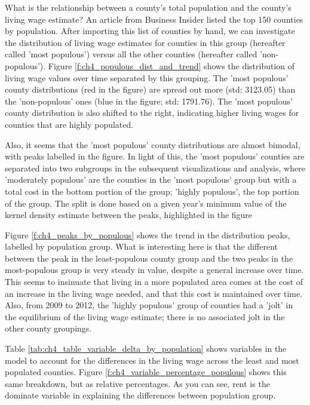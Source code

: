 What is the relationship between a county's total population and the county's living wage estimate? An article from Business Insider \cite{populated_counties} listed the top 150 counties by population. After importing this list of counties by hand, we can investigate the distribution of living wage estimates for counties in this group (hereafter called 'most populous') versus all the other counties (hereafter called 'non-populous'). Figure \ref{f:ch4_populous_dist_and_trend} shows the distribution of living wage values over time separated by this grouping. The 'most populous' county distributions (red in the figure) are spread out more (std: 3123.05) than the 'non-populous' ones (blue in the figure; std: 1791.76). The 'most populous' county distribution is also shifted to the right, indicating higher living wages for counties that are highly populated. 

Also, it seems that the 'most populous' county distributions are almost bimodal, with peaks labelled in the figure. In light of this, the 'most populous' counties are separated into two subgroups in the subsequent visualizations and analysis, where 'moderately populous' are the counties in the 'most populous' group but with a total cost in the bottom portion of the group; 'highly populous', the top portion of the group. The split is done based on a given year's minimum value of the kernel density estimate between the peaks, highlighted in the figure

Figure \ref{f:ch4_peaks_by_populous} shows the trend in the distribution peaks, labelled by population group. What is interesting here is that the different between the peak in the least-populous county group and the two peaks in the most-populous group is very steady in value, despite a general increase over time. This seems to insinuate that living in a more populated area comes at the cost of an increase in the living wage needed, and that this cost is maintained over time. Also, from 2009 to 2012, the 'highly populous' group of counties had a 'jolt' in the equilibrium of the living wage estimate; there is no associated jolt in the other county groupings.

Table \ref{tab:ch4_table_variable_delta_by_population} shows variables in the model to account for the differences in the living wage across the least and most populated counties. Figure \ref{f:ch4_variable_percentage_populous} shows this same breakdown, but as relative percentages. As you can see, rent is the dominate variable in explaining the differences between population group.



